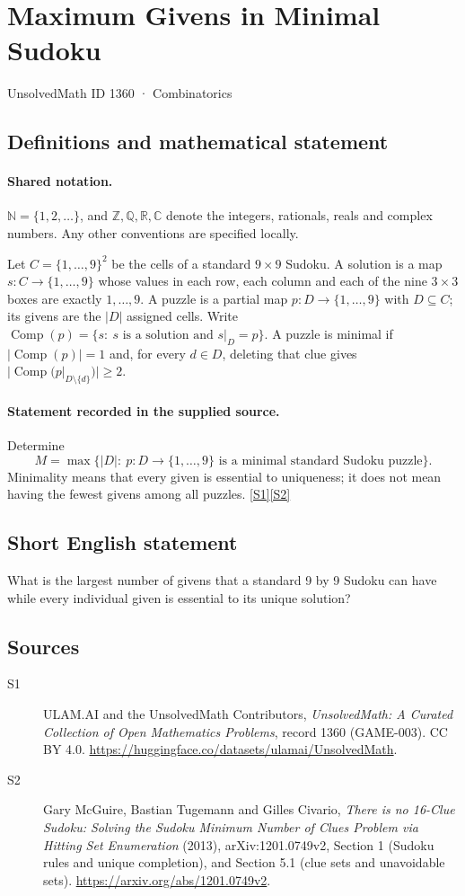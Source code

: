 \documentclass[11pt]{article}
\newcommand{\sref}[2]{\hyperlink{source:#1:#2}{[S#2]}}
\begin{document}
\setcounter{section}{1359}
\section{Maximum Givens in Minimal Sudoku}\label{1360}
{\small\sffamily UnsolvedMath ID 1360 · Combinatorics}
\subsection{Definitions and mathematical statement}

\paragraph{Shared notation.}$\mathbb N=\{1,2,\ldots\}$, and $\mathbb Z,\mathbb Q,\mathbb R,\mathbb C$ denote the integers, rationals, reals and complex numbers. Any other conventions are specified locally.


Let $C=\{1,\ldots,9\}^2$ be the cells of a standard $9\times9$ Sudoku. A solution is a map $s:C\to\{1,\ldots,9\}$ whose values in each row, each column and each of the nine $3\times3$ boxes are exactly $1,\ldots,9$. A puzzle is a partial map $p:D\to\{1,\ldots,9\}$ with $D\subseteq C$; its givens are the $|D|$ assigned cells. Write $\operatorname{Comp}(p)=\{s:\ s\text{ is a solution and }s|_D=p\}$. A puzzle is minimal if $|\operatorname{Comp}(p)|=1$ and, for every $d\in D$, deleting that clue gives $|\operatorname{Comp}(p|_{D\setminus\{d\}})|\ge2$.
\paragraph{Statement recorded in the supplied source.}
Determine
\[
 M=\max\bigl\{|D|:\ p:D\to\{1,\ldots,9\}\text{ is a minimal standard Sudoku puzzle}\bigr\}.
\]
Minimality means that every given is essential to uniqueness; it does not mean having the fewest givens among all puzzles. \sref{1360}{1}\sref{1360}{2}
\subsection{Short English statement}
What is the largest number of givens that a standard 9 by 9 Sudoku can have while every individual given is essential to its unique solution?
\subsection{Sources}
\begin{description}
\item[\hypertarget{source:1360:1}{S1}] ULAM.AI and the UnsolvedMath Contributors, \emph{UnsolvedMath: A Curated Collection of Open Mathematics Problems}, record 1360 (GAME-003). CC BY 4.0. \url{https://huggingface.co/datasets/ulamai/UnsolvedMath}.
\item[\hypertarget{source:1360:2}{S2}] Gary McGuire, Bastian Tugemann and Gilles Civario, \emph{There is no 16-Clue Sudoku: Solving the Sudoku Minimum Number of Clues Problem via Hitting Set Enumeration} (2013), arXiv:1201.0749v2, Section 1 (Sudoku rules and unique completion), and Section 5.1 (clue sets and unavoidable sets). \url{https://arxiv.org/abs/1201.0749v2}.
\end{description}
\label{end:1360}
\end{document}
